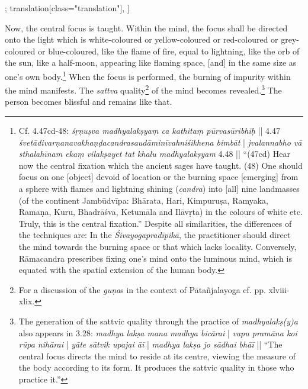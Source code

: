 \begin{alignment}[
  texts=edition[class="edition"];
  translation[class="translation"],
  ]
\begin{translation}
\begin{tlate}[p27_01]
   Now, the central focus is taught. Within the mind, the focus shall be directed onto the light which is white-coloured or yellow-coloured or red-coloured or grey-coloured or blue-coloured, like the flame of fire, equal to lightning, like the orb of the sun, like a half-moon, appearing like flaming space, [and] in the same size as one's own body.\footnote{Cf.  4.47cd-48: \textit{śṛṇuṣva madhyalakṣyaṃ ca kathitaṃ pūrvasūribhiḥ} || 4.47 \textit{śvetādivarṇanavakhaṇḍacandrasaudāminīvahniśikhena bimbāt} | \textit{jvalannabho vā sthalahīnam ekaṃ vilakṣayet tat khalu madhyalakṣyam} 4.48 || ``(47cd) Hear now the central fixation which the ancient sages have taught. (48) One should focus on one [object] devoid of location or the burning space [emerging] from a sphere with flames and lightning shining (\textit{candra}) into [all] nine landmasses (of the continent Jambūdvīpa: Bhārata, Hari, Kimpuruṣa, Ramyaka, Ramaṇa, Kuru, Bhadrāśva, Ketumāla and Ilāvṛta) in the colours of white etc. Truly, this is the central fixation.'' Despite all similarities, the differences of the techniques are: In the \textit{Śivayogapradīpikā}, the practitioner should direct the mind towards the burning space or that which lacks locality. Conversely, Rāmacandra prescribes fixing one's mind onto the luminous mind, which is equated with the spatial extension of the human body.}
  When the focus is performed, the burning of impurity within the mind manifests. The \textit{sattva} quality\footnote{For a discussion of the \textit{guṇa}s in the context of Pātañjalayoga cf. \citeauthor{bryant2009} pp. xlviii-xlix.} of the mind becomes revealed.\footnote{The generation of the sattvic quality through the practice of \textit{madhyalakṣ(y)a} also appears in  3.28: \textit{madhya lakṣa mana madhya bicārai} | \textit{vapu pramāna koi rūpa nihārai} | \textit{yāte sātvik upajai āī} | \textit{madhya lakṣa jo sādhai bhāī} || ``The central focus directs the mind to reside at its centre, viewing the measure of the body according to its form. It produces the sattvic quality in those who practice it.''} The person becomes blissful and remains like that.  
\end{tlate}
  \end{translation}
\end{alignment}
\pagebreak %
